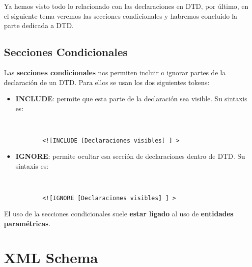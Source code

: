 Ya hemos visto todo lo relacionado con las declaraciones en DTD, por último, en el siguiente tema veremos las secciones condicionales y habremos concluido la parte dedicada a DTD.

\subsection{Secciones Condicionales}
Las \textbf{secciones condicionales} nos permiten incluir o ignorar partes de la declaración de un DTD. Para ellos se usan los dos siguientes tokens:

\begin{itemize}
    \item \textbf{INCLUDE}: permite que esta parte de la declaración sea visible. Su sintaxis es:

    \begin{figure}[H]
        \begin{tcolorbox}[sharp corners, colback=yellow!30, colframe=white!20]
            \scriptsize
            \begin{verbatim}


  <![INCLUDE [Declaraciones visibles] ] >
            \end{verbatim}
        \end{tcolorbox}
    \end{figure}

    \item \textbf{IGNORE}: permite ocultar esa sección de declaraciones dentro de DTD. Su sintaxis es:

    \begin{figure}[H]
        \begin{tcolorbox}[sharp corners, colback=yellow!30, colframe=white!20]
            \scriptsize
            \begin{verbatim}


  <![IGNORE [Declaraciones visibles] ] >
            \end{verbatim}
        \end{tcolorbox}
    \end{figure}
\end{itemize}

El uso de la secciones condicionales suele \textbf{estar ligado} al uso de \textbf{entidades paramétricas}.

\section{XML Schema}





\glsaddall
\printglossaries


\newpage
{}



